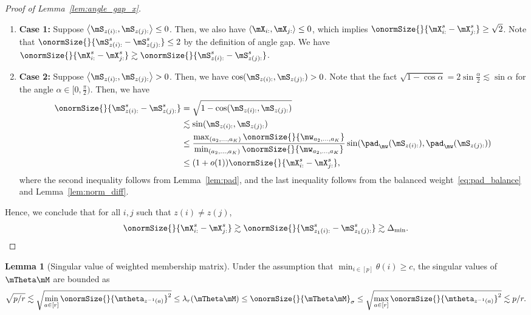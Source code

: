 \documentclass[lettersize,onecolumn,journal]{IEEEtran}
\theoremstyle{definition}
\newtheorem{lem}{Lemma}
\theoremstyle{definition}
\newcommand{\ang}[1]{\left\langle#1\right\rangle}
\begin{document}
\begin{proof}[Proof of Lemma~\ref{lem:angle_gap_x}]
\begin{enumerate}[wide]
    \item \textbf{Case 1:} Suppose $\ang{\mS_{z(i):}, \mS_{z(j):}} \leq 0$. Then, we also have $\ang{\mX_{i:},\mX_{j:}} \leq 0$, which implies $\onormSize{}{\mX_{i:}^s -  \mX_{j:}^s} \geq \sqrt{2}$. Note that $\onormSize{}{\mS_{z(i):}^s - \mS_{z(j):}^s} \leq 2$ by the definition of angle gap. We have $\onormSize{}{\mX_{i:}^s -  \mX_{j:}^s} \gtrsim \onormSize{}{\mS_{z(i):}^s - \mS_{z(j):}^s}$.
    \item \textbf{Case 2:} Suppose $\ang{\mS_{z(i):}, \mS_{z(j):}} > 0$. Then, we have $\cos(\mS_{z(i):}, \mS_{z(j):}) > 0$. Note that the fact $\sqrt{1 - \cos \alpha} = 2 \sin \frac{\alpha}{2} \lesssim \sin \alpha$ for the angle $\alpha \in [0, \frac{\pi}{2})$. Then, we have 
    \begin{align}
        \onormSize{}{\mS_{z(i):}^s - \mS_{z(j):}^s} &= \sqrt{ 1 - \cos(\mS_{z(i):}, \mS_{z(j):})}  \\
        & \lesssim \sin (\mS_{z(i):}, \mS_{z(j):})\\
        & \leq \frac{ \max_{(a_2,\ldots, a_K)} \onormSize{}{\mw_{a_2,\ldots, a_K}} }{  \min_{(a_2,\ldots, a_K)} \onormSize{}{\mw_{a_2,\ldots, a_K}} }  \sin ( \pad_{\mw} (\mS_{z(i):}), \pad_{\mw}(\mS_{z(j):})) \\
        & \leq (1 + o(1)) \onormSize{}{\mX_{i:}^s -  \mX_{j:}^s},
    \end{align}
    where the second inequality follows from Lemma~\ref{lem:pad}, and the last inequality follows from the balanced weight~\eqref{eq:pad_balance} and Lemma~\ref{lem:norm_diff}.
\end{enumerate}

Hence, we conclude that for all $i,j$ such that $z(i) \neq z(j)$,
\begin{equation}
    \onormSize{}{\mX_{i:}^s - \mX_{j:}^s} \gtrsim  \onormSize{}{\mS_{z_1(i):}^s - \mS_{z_1(j):}^s} \gtrsim  \Delta_{\min}.
\end{equation}
\end{proof}

\begin{lem}[Singular value of weighted membership matrix]\label{lem:singular_thetam} Under the assumption that $\min_{i \in [p]} \theta(i) \geq c$, the singular values of $\mTheta \mM$ are bounded as 
\begin{equation}\label{eq:membership2}
     \sqrt{p/r} \lesssim \sqrt{ \min_{a \in [r]}\onormSize{}{ \mtheta_{ z^{-1}(a)} }^2 }  \leq \lambda_{r}(\mTheta \mM) \leq \onormSize{}{\mTheta \mM}_{\sigma} \leq\sqrt{ \max_{a \in [r]}\onormSize{}{ \mtheta_{ z^{-1}(a)} }^2 } \lesssim  p /r .
\end{equation}
\end{lem}
\end{document}
